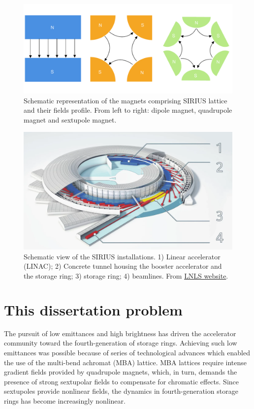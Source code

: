 \begin{figure}
    \includegraphics[width=\textwidth]{Images/magnets.pdf}
    \caption{Schematic representation of the magnets comprising SIRIUS lattice and their fields profile. From left to right: dipole magnet, quadrupole magnet and sextupole magnet.}
\end{figure}
\begin{figure}
    \includegraphics[width=\textwidth]{Images/sirius_facility.png}
    \caption{Schematic view of the SIRIUS installations. 1) Linear accelerator (LINAC); 2) Concrete tunnel housing the booster accelerator and the storage ring; 3) storage ring; 4) beamlines. From \href{https://lnls.cnpem.br/sirius/como-funciona-o-sirius/}{LNLS website}.}
\end{figure}
\section{This dissertation problem}
The pursuit of low emittances and high brightness has driven the accelerator community toward the fourth-generation of storage rings. Achieving such low emittances was possible because of series of technological advances which enabled the use of the multi-bend achromat (MBA) lattice. MBA lattices require intense gradient fields provided by quadrupole magnets, which, in turn, demands the presence of strong sextupolar fields to compensate for chromatic effects. Since sextupoles provide nonlinear fields, the dynamics in fourth-generation storage rings has become increasingly nonlinear.

